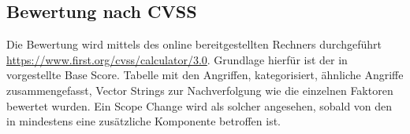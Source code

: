 \subsection{Bewertung nach CVSS}
\label{sec:analysis_cvss}
    Die Bewertung wird mittels des online bereitgestellten Rechners durchgeführt \url{https://www.first.org/cvss/calculator/3.0}.
    Grundlage hierfür ist der in  vorgestellte Base Score.
	Tabelle mit den Angriffen, kategorisiert, ähnliche Angriffe zusammengefasst, Vector Strings zur Nachverfolgung wie die einzelnen Faktoren bewertet wurden.
	Ein Scope Change wird als solcher angesehen, sobald von den in  mindestens eine zusätzliche Komponente betroffen ist.
	
